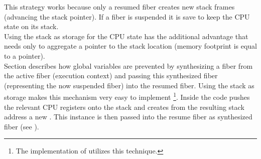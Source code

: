 This strategy works because only a resumed fiber creates new stack frames
(advancing the stack pointer). If a fiber is suspended it is save to keep the
CPU state on its stack.\\

Using the stack as storage for the CPU state has the additional advantage that
\fiber needs only to aggregate a pointer to the stack location (memory footprint
is equal to a pointer).\\
Section  describes how global variables are prevented
by synthesizing a fiber from the active fiber (execution context) and passing
this synthesized fiber (representing the now suspended fiber) into the resumed
fiber. Using the stack as storage makes this mechanism very easy to implement
\footnote{The implementation of \bcontext\cite{bcontext} utilizes this
technique.}.
Inside \resume the code pushes the relevant CPU registers onto the stack and
creates from the resulting stack address a new \fiber. This instance is then
passed into the resume fiber as synthesized fiber (see
).\\

